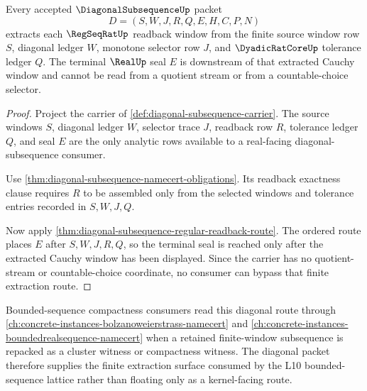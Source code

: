 \begin{theorem}
\label{thm:diagonal-subsequence-cauchy-window-extraction}
Every accepted $\DiagonalSubsequenceUp$ packet
$$
D=(S,W,J,R,Q,E,H,C,P,N)
$$
extracts each $\RegSeqRatUp$ readback window from the finite source window row $S$, diagonal ledger $W$, monotone selector row $J$, and $\DyadicRatCoreUp$ tolerance ledger $Q$. The terminal $\RealUp$ seal $E$ is downstream of that extracted Cauchy window and cannot be read from a quotient stream or from a countable-choice selector.
\end{theorem}
\begin{proof}
Project the carrier of \autoref{def:diagonal-subsequence-carrier}. The source windows $S$, diagonal ledger $W$, selector trace $J$, readback row $R$, tolerance ledger $Q$, and seal $E$ are the only analytic rows available to a real-facing diagonal-subsequence consumer.

Use \autoref{thm:diagonal-subsequence-namecert-obligations}. Its readback exactness clause requires $R$ to be assembled only from the selected windows and tolerance entries recorded in $S,W,J,Q$.

Now apply \autoref{thm:diagonal-subsequence-regular-readback-route}. The ordered route places $E$ after $S,W,J,R,Q$, so the terminal seal is reached only after the extracted Cauchy window has been displayed. Since the carrier has no quotient-stream or countable-choice coordinate, no consumer can bypass that finite extraction route.
\end{proof}

Bounded-sequence compactness consumers read this diagonal route through \autoref{ch:concrete-instances-bolzanoweierstrass-namecert} and \autoref{ch:concrete-instances-boundedrealsequence-namecert} when a retained finite-window subsequence is repacked as a cluster witness or compactness witness. The diagonal packet therefore supplies the finite extraction surface consumed by the L10 bounded-sequence lattice rather than floating only as a kernel-facing route.


